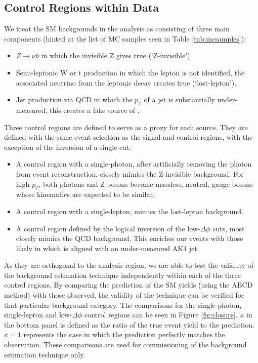 \subsection{Control Regions within Data}
\label{sec:smbkg}

We treat the SM backgrounds in the analysis as consisting of three main components (hinted at the list of MC samples seen in Table \ref{tab:mcsamples}):

\begin{itemize}
\item $Z\rightarrow\nu\bar{\nu}$ in which the invisible Z gives true \ptmiss (`Z-invisible').
\item Semi-leptonic W or t production in which the lepton is not identified, the associated neutrino from the leptonic decay creates true \ptmiss (`lost-lepton').
\item Jet production via QCD in which the $p_{T}$ of a jet is substantially under-measured, this creates a fake source of \ptmiss.
\end{itemize}

Three control regions are defined to serve as a proxy for each source. They are defined with the same event selection as the signal and control regions, with the exception of the inversion of a single cut.

\begin{itemize}
\item A control region with a single-photon, after artificially removing the photon from event reconstruction, closely mimics the Z-invisible background. For high-$p_{T}$, both photons and Z bosons become massless, neutral, gauge bosons whose kinematics are expected to be similar.
\item A control region with a single-lepton, mimics the lost-lepton background.
\item A control region defined by the logical inversion of the low-$\Delta\phi$ cuts, most closely mimics the QCD background. This enriches our events with those likely in which \ptmiss is aligned with an under-measured AK4 jet.
\end{itemize}

As they are orthogonal to the analysis region, we are able to test the validuty of the background estimation technique independently within each of the three control regions. By comparing the prediction of the SM yields (using the ABCD method) with those observed, the validity of the technique can be verified for that particular background category. The comparisons for the single-photon, single-lepton and low-$\Delta\phi$ control regions can be seen in Figure \ref{fig:closure}. $\kappa$ in the bottom panel is defined as the ratio of the true event yield to the prediction. $\kappa=1$ represents the case in which the prediction perfectly matches the observation. These comparisons are used for commissioning of the background estimation technique only.


